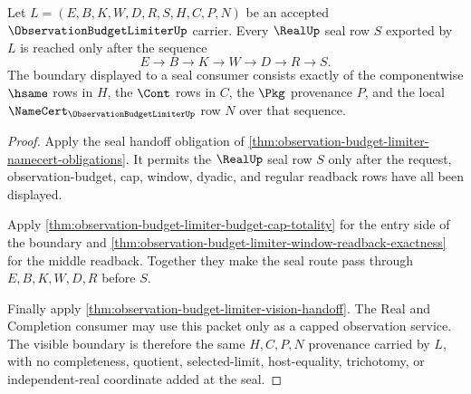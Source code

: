 \begin{theorem}
\label{thm:observation-budget-limiter-real-seal-cap-boundary}
Let $L=(E,B,K,W,D,R,S,H,C,P,N)$ be an accepted $\ObservationBudgetLimiterUp$ carrier. Every $\RealUp$ seal row $S$ exported by $L$ is reached only after the sequence
$$
E \to B \to K \to W \to D \to R \to S.
$$
The boundary displayed to a seal consumer consists exactly of the componentwise $\hsame$ rows in $H$, the $\Cont$ rows in $C$, the $\Pkg$ provenance $P$, and the local $\NameCert_{\ObservationBudgetLimiterUp}$ row $N$ over that sequence.
\end{theorem}
\begin{proof}
Apply the seal handoff obligation of \autoref{thm:observation-budget-limiter-namecert-obligations}. It permits the $\RealUp$ seal row $S$ only after the request, observation-budget, cap, window, dyadic, and regular readback rows have all been displayed.

Apply \autoref{thm:observation-budget-limiter-budget-cap-totality} for the entry side of the boundary and \autoref{thm:observation-budget-limiter-window-readback-exactness} for the middle readback. Together they make the seal route pass through $E,B,K,W,D,R$ before $S$.

Finally apply \autoref{thm:observation-budget-limiter-vision-handoff}. The Real and Completion consumer may use this packet only as a capped observation service. The visible boundary is therefore the same $H,C,P,N$ provenance carried by $L$, with no completeness, quotient, selected-limit, host-equality, trichotomy, or independent-real coordinate added at the seal.
\end{proof}

